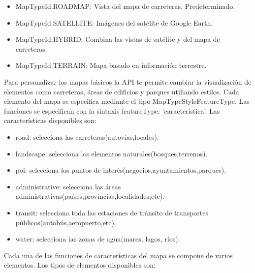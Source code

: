 \begin{itemize}

\item MapTypeId.ROADMAP: Vista del mapa de carreteras. Predeterminado.

\item MapTypeId.SATELLITE: Imágenes del satélite de Google Earth.

\item MapTypeId.HYBRID: Combina las vistas de satélite y del mapa de carreteras.

\item MapTypeId.TERRAIN: Mapa basado en información terrestre.

\end{itemize}

\vspace{5 mm}

Para personalizar los mapas básicos la API te permite cambiar la visualización de elementos como carreteras, áreas de edificios y parques utiliando estilos. Cada elemento del mapa se especifica mediante el tipo MapTypeStyleFeatureType. Las funciones se especifican con la sintaxis featureType: 'característica'. Las características disponibles son:

\begin{itemize}

\item road: selecciona las carreteras(autovías,locales).

\item landscape: selecciona los elementos naturales(bosques,terrenos).

\item poi: selecciona los puntos de interés(negocios,ayuntamientos,parques).

\item administrative: selecciona las áreas administrativas(países,províncias,localidades,etc).

\item transit: selecciona toda las estaciones de tránsito de transportes públicos(autobús,aeropuerto,etc).

\item water: selecciona las zonas de agua(mares, lagos, ríos).

\end{itemize}

\vspace{5 mm}

Cada una de las funciones de características del mapa se compone de varios elementos. Los tipos de elementos disponibles son:

